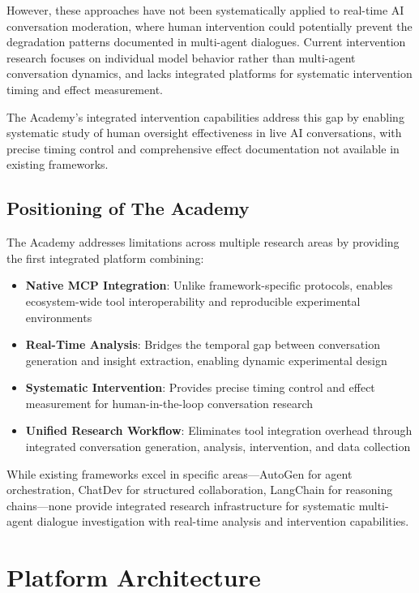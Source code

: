 \documentclass[11pt,letterpaper]{article}
\newcommand{\theacademy}{The Academy}
\begin{document}
However, these approaches have not been systematically applied to real-time AI conversation moderation, where human intervention could potentially prevent the degradation patterns documented in multi-agent dialogues. Current intervention research focuses on individual model behavior rather than multi-agent conversation dynamics, and lacks integrated platforms for systematic intervention timing and effect measurement.

\theacademy{}'s integrated intervention capabilities address this gap by enabling systematic study of human oversight effectiveness in live AI conversations, with precise timing control and comprehensive effect documentation not available in existing frameworks.

\subsection{Positioning of \theacademy{}}

\theacademy{} addresses limitations across multiple research areas by providing the first integrated platform combining:

\begin{itemize}
    \item \textbf{Native MCP Integration}: Unlike framework-specific protocols, enables ecosystem-wide tool interoperability and reproducible experimental environments
    \item \textbf{Real-Time Analysis}: Bridges the temporal gap between conversation generation and insight extraction, enabling dynamic experimental design
    \item \textbf{Systematic Intervention}: Provides precise timing control and effect measurement for human-in-the-loop conversation research
    \item \textbf{Unified Research Workflow}: Eliminates tool integration overhead through integrated conversation generation, analysis, intervention, and data collection
\end{itemize}

While existing frameworks excel in specific areas—AutoGen for agent orchestration, ChatDev for structured collaboration, LangChain for reasoning chains—none provide integrated research infrastructure for systematic multi-agent dialogue investigation with real-time analysis and intervention capabilities.
\section{Platform Architecture}
\end{document}
